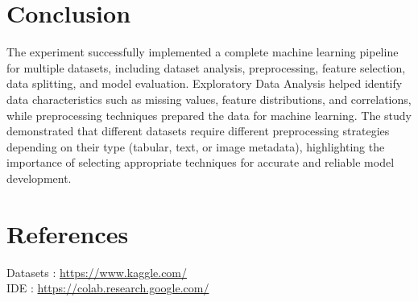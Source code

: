 \documentclass[12pt,a4paper]{article}
\begin{document}
\section{Conclusion}
The experiment successfully implemented a complete machine learning pipeline for multiple datasets, including dataset analysis, preprocessing, feature selection, data splitting, and model evaluation. Exploratory Data Analysis helped identify data characteristics such as missing values, feature distributions, and correlations, while preprocessing techniques prepared the data for machine learning. The study demonstrated that different datasets require different preprocessing strategies depending on their type (tabular, text, or image metadata), highlighting the importance of selecting appropriate techniques for accurate and reliable model development.

\section{References}
Datasets :  \url{https://www.kaggle.com/}
\\ IDE : \url{https://colab.research.google.com/}
\end{document}
